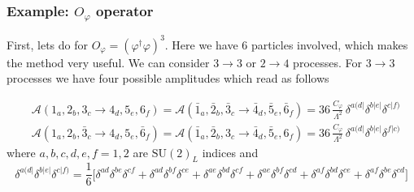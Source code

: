 \documentclass[a4paper,11pt]{article}
\begin{document}
\subsubsection{Example: \texorpdfstring{$O_\varphi$}{Ophi} operator}\label{sec:example O_phi}
First, lets do for $O_\varphi=(\varphi^\dagger \varphi)^3$. Here we have $6$ particles involved, which makes the method very useful. We can consider $3\to3$ or $2\to 4$ processes. For $3\to3$ processes we have four possible amplitudes which read as follows

\begin{align}
    &\mathcal{A}(1_a,2_b,3_c\to 4_d,5_e,6_f)=\mathcal{A}(\bar{1}_a,\bar{2}_b,\bar{3}_c\to \bar{4}_d,\bar{5}_e,\bar{6}_f)=36\,\frac{C_\varphi}{\Lambda^2}\,\delta^{a(d|}\delta^{b|e|}\delta^{c|f)}\\
    &\mathcal{A}(1_a,2_b,\bar{3}_c\to 4_d,5_e,\bar{6}_f)=\mathcal{A}(\bar{1}_a,\bar{2}_b,3_c\to \bar{4}_d,\bar{5}_e,6_f)=36\,\frac{C_\varphi}{\Lambda^2}\,\delta^{a(d|}\delta^{b|e|}\delta^{f|c)}
\end{align}
where $a,b,c,d,e,f=1,2$ are $\mathrm{SU}(2)_L$ indices and 
\begin{equation}
    \delta^{a(d|}\delta^{b|e|}\delta^{c|f)}=\frac{1}{6}\Big[\delta^{ad}\delta^{be}\delta^{cf}+\delta^{ad}\delta^{bf}\delta^{ce}+\delta^{ae}\delta^{bd}\delta^{cf}+\delta^{ae}\delta^{bf}\delta^{cd}+\delta^{af}\delta^{bd}\delta^{ce}+\delta^{af}\delta^{be}\delta^{cd}\Big]
\end{equation}
\end{document}

